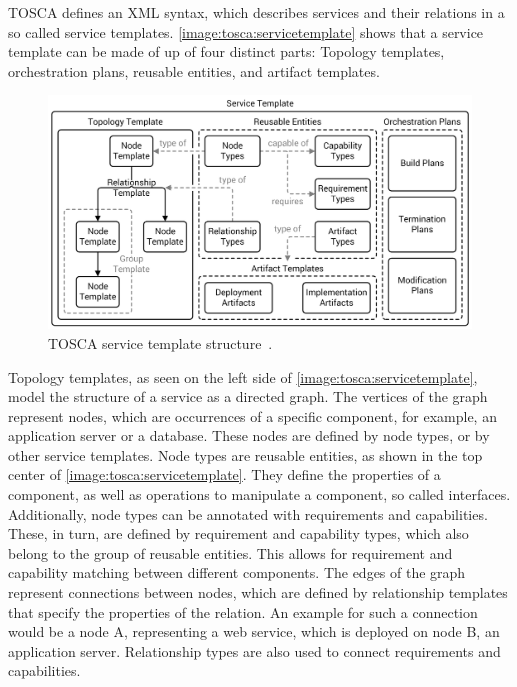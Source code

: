 TOSCA defines an XML syntax, which describes services and their relations in a so called service templates.
\autoref{image:tosca:servicetemplate} shows that a service template can be made of up of four distinct parts: Topology templates, orchestration plans, reusable entities, and artifact templates.

\begin{figure}[!htbp]
	\centering
	\includegraphics[resolution=600]{fundamentals/assets/service_template}
	\caption{TOSCA service template structure~\autocite[based on][]{tosca:spec}.}
	\label{image:tosca:servicetemplate}
\end{figure}

Topology templates, as seen on the left side of \autoref{image:tosca:servicetemplate}, model the structure of a service as a directed graph.
The vertices of the graph represent nodes, which are occurrences of a specific component, for example, an application server or a database.
These nodes are defined by node types, or by other service templates.
Node types are reusable entities,  as shown in the top center of \autoref{image:tosca:servicetemplate}.
They define the properties of a component, as well as operations to manipulate a component, so called interfaces.
Additionally, node types can be annotated with requirements and capabilities.
These, in turn, are defined by requirement and capability types, which also belong to the group of reusable entities.
This allows for requirement and capability matching between different components.
The edges of the graph represent connections between nodes, which are defined by relationship templates that specify the properties of the relation.
An example for such a connection would be a node A, representing a web service, which is deployed on node B, an application server.
Relationship types are also used to connect requirements and capabilities.

